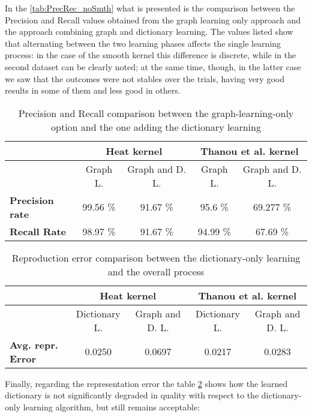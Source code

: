 In the \autoref{tab:PrecRec_noSmth} what is presented is the comparison between the Precision and Recall values obtained from the graph learning only approach and the approach combining graph and dictionary learning. The values listed show that alternating between the two learning phases affects the single learning process: in the case of the smooth kernel this difference is discrete, while in the second dataset can be clearly noted; at the same time, though, in the latter case we saw that the outcomes were not stables over the trials, having very good results in some of them and less good in others.

\begin{table}[htbp]
  \centering
  \begin{tabular}{lcccc}
  &\multicolumn{2}{c}{\textbf{Heat kernel}}&\multicolumn{2}{c}{\textbf{Thanou et al. kernel}}\\
  \toprule
  &Graph L. & Graph and D. L. & Graph L. & Graph and D. L.\\ %
    \midrule
    \textbf{Precision rate} & 99.56 \% & 91.67 \% & 95.6 \% & 69.277 \%\\
    \textbf{Recall Rate} & 98.97 \% &  91.67 \% & 94.99 \% & 67.69 \%\\
    \bottomrule
  \end{tabular}
  \caption{Precision and Recall comparison between the graph-learning-only option and the one adding the dictionary learning}
  \label{tab:PrecRec_noSmth}
\end{table}

\begin{table}[ht]
  \centering
  \begin{tabular}{lcccc}
  &\multicolumn{2}{c}{\textbf{Heat kernel}}&\multicolumn{2}{c}{\textbf{Thanou et al. kernel}}\\
  \toprule
  &Dictionary L. & Graph and D. L. & Dictionary L. & Graph and D. L.\\ %
    \midrule
    \textbf{Avg. repr. Error} & 0.0250 & 0.0697 & 0.0217 & 0.0283\\
    \bottomrule
  \end{tabular}
  \caption{Reproduction error comparison between the dictionary-only learning and the overall process}
  \label{tab:errorGD}
\end{table}

Finally, regarding the representation error the table \ref{tab:errorGD} shows how the learned dictionary is not significantly degraded in quality with respect to the dictionary-only learning algorithm, but still remains acceptable:

